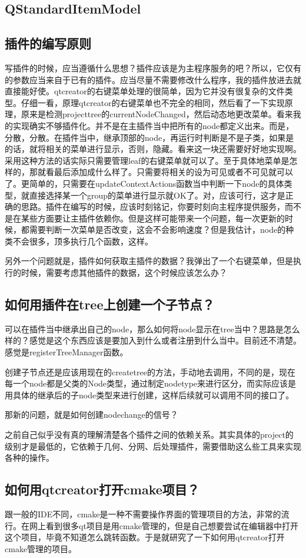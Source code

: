 \subsection{QStandardItemModel}
\subsection{插件的编写原则}
写插件的时候，应当遵循什么思想？插件应该是为主程序服务的吧？所以，它仅有的参数应当来自于已有的插件。应当尽量不需要修改什么程序，我的插件放进去就直接能好使。qtcreator的右键菜单处理的很简单，因为它并没有很复杂的文件类型。仔细一看，原理qtcreator的右键菜单也不完全的相同，然后看了一下实现原理，原来是检测projecttree的currentNodeChanged，然后动态地更改菜单。看来我的实现确实不够插件化。并不是在主插件当中把所有的node都定义出来。而是，分散，分散。在插件当中，继承顶部的node，再运行时判断是不是子类，如果是的话，就将相关的菜单进行显示，否则，隐藏。看来这一块还需要好好地实现啊。采用这种方法的话实际只需要管理leaf的右键菜单就可以了。至于具体地菜单是怎样的，那就看最后添加成什么样了。只需要将相关的设为可见或者不可见就可以了。更简单的，只需要在updateContextActions函数当中判断一下node的具体类型，就直接选择某一个group的菜单进行显示就OK了。对，应该可行，这才是正确的思路。插件在编写的时候，应该时刻铭记，你要时刻向主程序提供服务，而不是在某些方面要让主插件依赖你。但是这样可能带来一个问题，每一次更新的时候，都需要判断一次菜单是否改变，这会不会影响速度？但是我估计，node的种类不会很多，顶多执行几个函数，这样。

另外一个问题就是，插件如何获取主插件的数据？我弹出了一个右键菜单，但是执行的时候，需要考虑其他插件的数据，这个时候应该怎么办？
\subsection{如何用插件在tree上创建一个子节点？}
可以在插件当中继承出自己的node，那么如何将node显示在tree当中？思路是怎么样的？感觉是这个东西应该是要加入到什么或者注册到什么当中。目前还不清楚。感觉是registerTreeManager函数。

创建子节点还是应该用现在的createtree的方法，手动地去调用，不同的是，现在每一个node都是父类的Node类型，通过制定nodetype来进行区分，而实际应该是用具体的继承后的子node类型来进行创建，这样后续就可以调用不同的接口了。

那新的问题，就是如何创建nodechange的信号？

之前自己似乎没有真的理解清楚各个插件之间的依赖关系。其实具体的project的级别才是最低的，它依赖于几何、分网、后处理插件，需要借助这么些工具来实现各种的操作。
\subsection{如何用qtcreator打开cmake项目？}
跟一般的IDE不同，cmake是一种不需要操作界面的管理项目的方法，非常的流行。在网上看到很多qt项目是用cmake管理的，但是自己想要尝试在编辑器中打开这个项目，毕竟不知道怎么跳转函数。于是就研究了一下如何用qtcreator打开cmake管理的项目。

